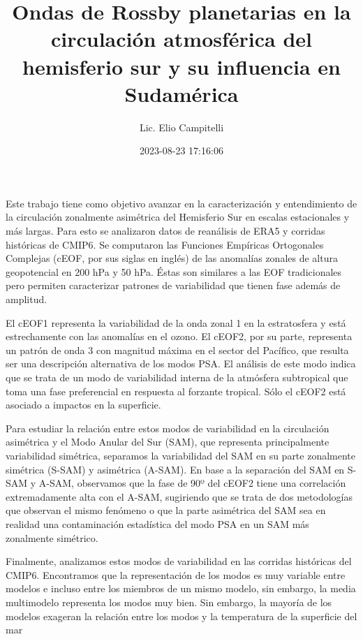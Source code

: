 \documentclass[12pt,oneside]{reedthesis}
\title{Ondas de Rossby planetarias en la circulación atmosférica del hemisferio sur y su influencia en Sudamérica}
\author{Lic. Elio Campitelli}
\date{2023-08-23 17:16:06}
\begin{document}
  \maketitle

\frontmatter %
\pagestyle{empty} %


  \begin{resumen}
    Este trabajo tiene como objetivo avanzar en la caracterización y entendimiento de la circulación zonalmente asimétrica del Hemisferio Sur en escalas estacionales y más largas.
    Para esto se analizaron datos de reanálisis de ERA5 y corridas históricas de CMIP6.
    Se computaron las Funciones Empíricas Ortogonales Complejas (cEOF, por sus siglas en inglés) de las anomalías zonales de altura geopotencial en 200 hPa y 50 hPa.
    Éstas son similares a las EOF tradicionales pero permiten caracterizar patrones de variabilidad que tienen fase además de amplitud.

    El cEOF1 representa la variabilidad de la onda zonal 1 en la estratosfera y está estrechamente con las anomalías en el ozono.
    El cEOF2, por su parte, representa un patrón de onda 3 con magnitud máxima en el sector del Pacífico, que resulta ser una descripción alternativa de los modos PSA.
    El análisis de este modo indica que se trata de un modo de variabilidad interna de la atmósfera subtropical que toma una fase preferencial en respuesta al forzante tropical.
    Sólo el cEOF2 está asociado a impactos en la superficie.

    Para estudiar la relación entre estos modos de variabilidad en la circulación asimétrica y el Modo Anular del Sur (SAM), que representa principalmente variabilidad simétrica, separamos la variabilidad del SAM en su parte zonalmente simétrica (S-SAM) y asimétrica (A-SAM).
    En base a la separación del SAM en S-SAM y A-SAM, observamos que la fase de 90º del cEOF2 tiene una correlación extremadamente alta con el A-SAM, sugiriendo que se trata de dos metodologías que observan el mismo fenómeno o que la parte asimétrica del SAM sea en realidad una contaminación estadística del modo PSA en un SAM más zonalmente simétrico.

    Finalmente, analizamos estos modos de variabilidad en las corridas históricas del CMIP6.
    Encontramos que la representación de los modos es muy variable entre modelos e incluso entre los miembros de un mismo modelo, sin embargo, la media multimodelo representa los modos muy bien.
    Sin embargo, la mayoría de los modelos exageran la relación entre los modos y la temperatura de la superficie del mar
  \end{resumen}
\end{document}
